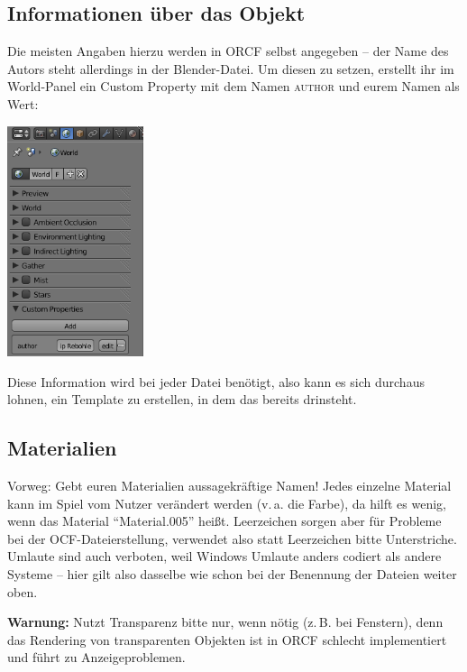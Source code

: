 \documentclass[a4paper]{article}
\newcommand{\ccaption}[1]{\textsc{#1}}
\newcommand{\warning}[1]{\textbf{Warnung:} #1 \par}
\begin{document}
\subsection{Informationen über das Objekt}
Die meisten Angaben hierzu werden in ORCF selbst angegeben -- der Name des Autors steht allerdings in der Blender-Datei. Um diesen zu setzen, erstellt ihr
im World-Panel ein Custom Property mit dem Namen \ccaption{author} und eurem Namen als Wert:
\begin{center}
\includegraphics[width=40mm]{../images/blender/world-author.png}
\end{center}
Diese Information wird bei jeder Datei benötigt, also kann es sich durchaus lohnen, ein Template zu erstellen, in dem das bereits drinsteht.

\subsection{Materialien}
Vorweg: Gebt euren Materialien aussagekräftige Namen! Jedes einzelne Material kann im Spiel vom Nutzer verändert werden (v.\,a. die Farbe), da hilft
es wenig, wenn das Material "`Material.005"' heißt. Leerzeichen sorgen aber für Probleme bei der OCF-Dateierstellung, verwendet also statt Leerzeichen
bitte Unterstriche. Umlaute sind auch verboten, weil Windows Umlaute anders codiert als andere Systeme -- hier gilt also dasselbe wie schon bei der
Benennung der Dateien weiter oben.

\warning{Nutzt Transparenz bitte nur, wenn nötig (z.\,B. bei Fenstern), denn das Rendering von transparenten Objekten ist in ORCF schlecht implementiert
  und führt zu Anzeigeproblemen.}
\end{document}
